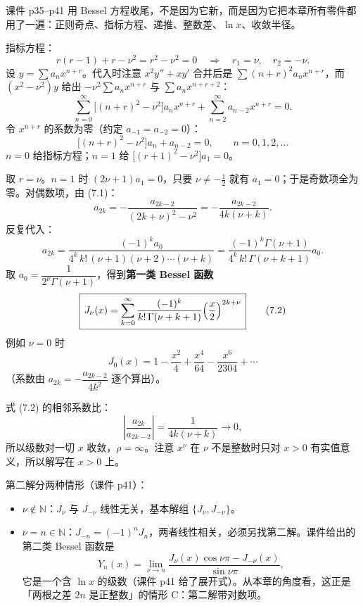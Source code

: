 \documentclass[11pt]{ctexart}
\let\origsubhdr\subhdr
\renewcommand{\subhdr}[1]{\needspace{3\baselineskip}\origsubhdr{#1}}
\newcommand{\N}{\mathbb{N}}
\begin{document}
课件 p35--p41 用 Bessel 方程收尾，不是因为它新，而是因为它把本章所有零件都用了一遍：正则奇点、指标方程、递推、整数差、$\ln x$、收敛半径。




指标方程：
\[
r(r-1)+r-\nu^2=r^2-\nu^2=0
\quad\Longrightarrow\quad
r_1=\nu,\quad r_2=-\nu .
\]
设 $y=\sum a_nx^{n+r}$。代入时注意 $x^2y''+xy'$ 合并后是 $\sum(n+r)^2a_nx^{n+r}$，而 $(x^2-\nu^2)y$ 给出 $-\nu^2\sum a_nx^{n+r}$ 与 $\sum a_nx^{n+r+2}$：
\[
\sum_{n=0}^{\infty}\bigl[(n+r)^2-\nu^2\bigr]a_nx^{n+r}+\sum_{n=2}^{\infty}a_{n-2}x^{n+r}=0 .
\]
令 $x^{n+r}$ 的系数为零（约定 $a_{-1}=a_{-2}=0$）：
\[
\bigl[(n+r)^2-\nu^2\bigr]a_n+a_{n-2}=0,\qquad n=0,1,2,\dots \tag{7.1}
\]
$n=0$ 给指标方程；$n=1$ 给 $\bigl[(r+1)^2-\nu^2\bigr]a_1=0$。

取 $r=\nu$。$n=1$ 时 $(2\nu+1)a_1=0$，只要 $\nu\neq-\frac12$ 就有 $a_1=0$；于是奇数项全为零。对偶数项，由 (7.1)：
\[
a_{2k}=-\frac{a_{2k-2}}{(2k+\nu)^2-\nu^2}
=-\frac{a_{2k-2}}{4k(\nu+k)} .
\]
反复代入：
\[
a_{2k}=\frac{(-1)^ka_0}{4^k\,k!\,(\nu+1)(\nu+2)\cdots(\nu+k)}
=\frac{(-1)^k\Gamma(\nu+1)}{4^k\,k!\,\Gamma(\nu+k+1)}a_0 .
\]
取 $a_0=\dfrac{1}{2^\nu\Gamma(\nu+1)}$，得到\textbf{第一类 Bessel 函数}
\[
\boxed{\,J_\nu(x)=\sum_{k=0}^{\infty}\frac{(-1)^k}{k!\,\Gamma(\nu+k+1)}\Bigl(\frac{x}{2}\Bigr)^{2k+\nu}\,} \tag{7.2}
\]
例如 $\nu=0$ 时
\[
J_0(x)=1-\frac{x^2}{4}+\frac{x^4}{64}-\frac{x^6}{2304}+\cdots
\]
（系数由 $a_{2k}=-\dfrac{a_{2k-2}}{4k^2}$ 逐个算出）。


式 (7.2) 的相邻系数比：
\[
\left|\frac{a_{2k}}{a_{2k-2}}\right|=\frac{1}{4k(\nu+k)}\to0,
\]
所以级数对一切 $x$ 收敛，$\rho=\infty$。注意 $x^\nu$ 在 $\nu$ 不是整数时只对 $x>0$ 有实值意义，所以解写在 $x>0$ 上。

第二解分两种情形（课件 p41）：
\begin{itemize}
  \item $\nu\notin\N$：$J_\nu$ 与 $J_{-\nu}$ 线性无关，基本解组 $\{J_\nu,J_{-\nu}\}$。
  \item $\nu=n\in\N$：$J_{-n}=(-1)^nJ_n$，两者线性相关，必须另找第二解。课件给出的第二类 Bessel 函数是
  \[
  Y_n(x)=\lim_{\nu\to n}\frac{J_\nu(x)\cos\nu\pi-J_{-\nu}(x)}{\sin\nu\pi},
  \]
  它是一个含 $\ln x$ 的级数（课件 p41 给了展开式）。从本章的角度看，这正是「两根之差 $2n$ 是正整数」的情形 C：第二解带对数项。
\end{itemize}
\end{document}
